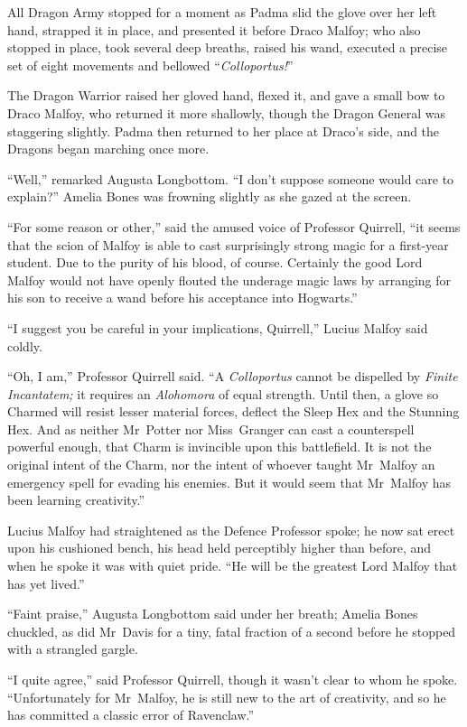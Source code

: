 All Dragon Army stopped for a moment as Padma slid the glove over her left hand, strapped it in place, and presented it before Draco Malfoy; who also stopped in place, took several deep breaths, raised his wand, executed a precise set of eight movements and bellowed “\emph{Colloportus!}”

The Dragon Warrior raised her gloved hand, flexed it, and gave a small bow to Draco Malfoy, who returned it more shallowly, though the Dragon General was staggering slightly. Padma then returned to her place at Draco’s side, and the Dragons began marching once more.

“Well,” remarked Augusta Longbottom. “I don’t suppose someone would care to explain?” Amelia Bones was frowning slightly as she gazed at the screen.

“For some reason or other,” said the amused voice of Professor Quirrell, “it seems that the scion of Malfoy is able to cast surprisingly strong magic for a first-year student. Due to the purity of his blood, of course. Certainly the good Lord Malfoy would not have openly flouted the underage magic laws by arranging for his son to receive a wand before his acceptance into Hogwarts.”

“I suggest you be careful in your implications, Quirrell,” Lucius Malfoy said coldly.

“Oh, I am,” Professor Quirrell said. “A \emph{Colloportus} cannot be dispelled by \emph{Finite Incantatem;} it requires an \emph{Alohomora} of equal strength. Until then, a glove so Charmed will resist lesser material forces, deflect the Sleep Hex and the Stunning Hex. And as neither Mr~Potter nor Miss~Granger can cast a counterspell powerful enough, that Charm is invincible upon this battlefield. It is not the original intent of the Charm, nor the intent of whoever taught Mr~Malfoy an emergency spell for evading his enemies. But it would seem that Mr~Malfoy has been learning creativity.”

Lucius Malfoy had straightened as the Defence Professor spoke; he now sat erect upon his cushioned bench, his head held perceptibly higher than before, and when he spoke it was with quiet pride. “He will be the greatest Lord Malfoy that has yet lived.”

“Faint praise,” Augusta Longbottom said under her breath; Amelia Bones chuckled, as did Mr~Davis for a tiny, fatal fraction of a second before he stopped with a strangled gargle.

“I quite agree,” said Professor Quirrell, though it wasn’t clear to whom he spoke. “Unfortunately for Mr~Malfoy, he is still new to the art of creativity, and so he has committed a classic error of Ravenclaw.”

